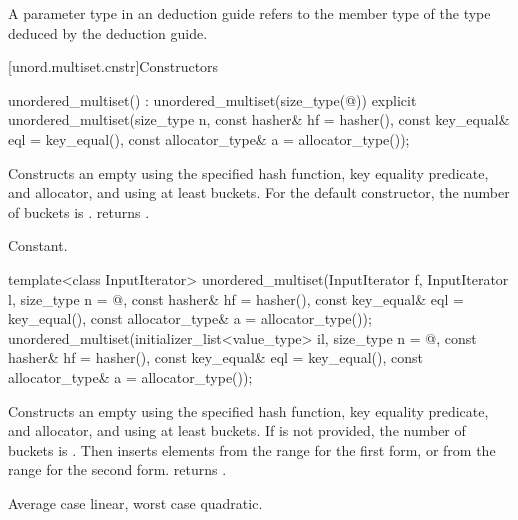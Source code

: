 \pnum
A  parameter type in an  deduction guide
refers to the  member type of
the type deduced by the deduction guide.

[unord.multiset.cnstr]{Constructors}

%
\begin{itemdecl}
unordered_multiset() : unordered_multiset(size_type(@\seebelow@)) { }
explicit unordered_multiset(size_type n,
                            const hasher& hf = hasher(),
                            const key_equal& eql = key_equal(),
                            const allocator_type& a = allocator_type());
\end{itemdecl}

\begin{itemdescr}
\pnum
\effects
Constructs an empty  using the
specified hash function, key equality predicate, and allocator, and
using at least  buckets.  For the default constructor,
the number of buckets is .
 returns .

\pnum
\complexity
Constant.
\end{itemdescr}

%
\begin{itemdecl}
template<class InputIterator>
  unordered_multiset(InputIterator f, InputIterator l,
                     size_type n = @\seebelow@,
                     const hasher& hf = hasher(),
                     const key_equal& eql = key_equal(),
                     const allocator_type& a = allocator_type());
unordered_multiset(initializer_list<value_type> il,
                   size_type n = @\seebelow@,
                   const hasher& hf = hasher(),
                   const key_equal& eql = key_equal(),
                   const allocator_type& a = allocator_type());
\end{itemdecl}

\begin{itemdescr}
\pnum
\effects
Constructs an empty  using the
specified hash function, key equality predicate, and allocator, and
using at least  buckets. If  is not
provided, the number of buckets is . Then
inserts elements from the range 
for the first form, or from the range
 for the second form.
 returns .

\pnum
\complexity
Average case linear, worst case quadratic.
\end{itemdescr}

